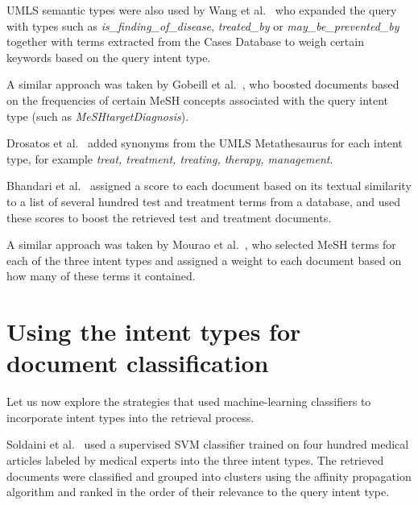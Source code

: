 UMLS semantic types were also used by Wang et al.\ \cite{udel} who expanded the query
with types such as \emph{is\_finding\_of\_disease}, \emph{treated\_by} or
\emph{may\_be\_prevented\_by} together with terms extracted from the Cases Database to weigh certain keywords
based on the query intent type. 

A similar approach was taken by Gobeill et al.\ \cite{bitem}, who boosted documents based on the 
frequencies of certain MeSH
concepts associated with the query intent type (such as \emph{MeSHtargetDiagnosis}). 

Drosatos et al.\ \cite{duth} added synonyms from the UMLS Metathesaurus for each intent type, for example
\emph{treat, treatment, treating, therapy, management}.

Bhandari et al.\ \cite{ir.cs.sfsu} assigned a score to each document based on
its textual similarity to a list of several hundred test and treatment terms from a database,
and used these scores to boost the retrieved test and treatment documents.

A similar approach was taken by Mourao et al.\ \cite{novasearch}, who selected MeSH
terms for each of the three intent types and assigned a weight to each
document based on how many of these terms it contained.
% 

\section{Using the intent types for document classification}
Let us now explore the strategies that used machine-learning classifiers to
incorporate intent types into the retrieval process.

Soldaini et al.\ \cite{soldani} used a supervised SVM classifier trained on four hundred medical articles
labeled by medical experts into the three intent types. The retrieved documents were classified 
and grouped into clusters using the affinity propagation algorithm and ranked in the order of their relevance
to the query intent type. 

